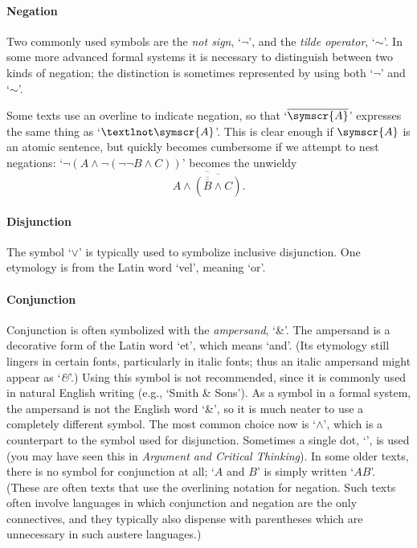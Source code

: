 \paragraph{Negation} Two commonly used symbols are the \emph{not sign}, `$¬$', and the \emph{tilde operator}, `$∼$'. In some more advanced formal systems it is necessary to distinguish between two kinds of negation; the distinction is sometimes represented by using both `$¬$' and `$∼$'.

Some texts use an overline to indicate negation, so that `$\overline{\symscr{A}}$' expresses the same thing as `$¬\symscr{A}$'. This is clear enough if $\symscr{A}$ is an atomic sentence, but quickly becomes cumbersome if we attempt to nest negations: `$¬(A \wedge ¬(¬¬B \wedge C))$' becomes the unwieldy $$\overline{A \wedge \overline{(\overline{\overline{B}}\wedge C)}}.$$

\paragraph{Disjunction} The symbol `$\vee$' is typically used to symbolize inclusive disjunction. One etymology is from the Latin word `vel', meaning `or'.%

\paragraph{Conjunction}
Conjunction is often symbolized with the \emph{ampersand}, `{\&}'. The ampersand is a decorative form of the Latin word `et', which means `and'.  (Its etymology still lingers in certain fonts, particularly in italic fonts; thus an italic ampersand might appear as `\emph{\&}'.) Using this symbol is not recommended, since it is commonly used in natural English writing (e.g., `Smith \& Sons'). As a symbol in a formal system, the ampersand is not the English word `\&', so it is much neater to use a completely different symbol. The most common choice now is `$\wedge$', which is a counterpart to the symbol used for disjunction. Sometimes a single dot, `{\scriptsize\textbullet}', is used (you may have seen this in \emph{Argument and Critical Thinking}). In some older texts, there is no symbol for conjunction at all; `$A$ and $B$' is simply written `$AB$'. (These are often texts that use the overlining notation for negation. Such texts often involve languages in which conjunction and negation are the only connectives, and they typically also dispense with parentheses which are unnecessary in such austere languages.)

